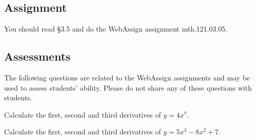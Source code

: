 \documentclass[12pt,addpoints, answers, fleqn]{exam}
\begin{document}
\subsection{Assignment}
You should read \S  3.5 and do the WebAssign assignment mth.121.03.05.
\vfill
\pagebreak
\begin{teacher}
\subsection{Assessments}
The following questions are related to the WebAssign assignments and may be used to assess students' ability. Please do not share any of these questions with students.
\begin{questions}		
\question 	%


Calculate the first, second and third derivatives of $y = 4x^7$.

\question 	%

Calculate the first, second and third derivatives of $y = 5x^3 - 8x^2 + 7$.
\end{questions}
\end{teacher}
\end{document}
